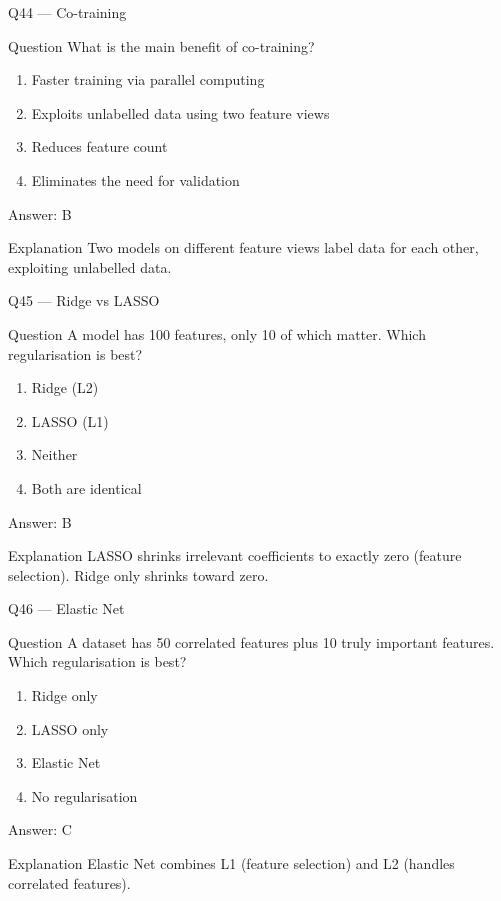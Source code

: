 \documentclass[aspectratio=169,8pt]{beamer}
\begin{document}
	\begin{frame}{Q44 --- Co-training}
		\begin{block}{Question}
			What is the main benefit of co-training?
		\end{block}
		\begin{enumerate}
			\item Faster training via parallel computing
			\item Exploits unlabelled data using two feature views
			\item Reduces feature count
			\item Eliminates the need for validation
		\end{enumerate}
		\begin{exampleblock}{Answer: B}\end{exampleblock}
		\begin{block}{Explanation}
			Two models on different feature views label data for each other, exploiting unlabelled data.
		\end{block}
	\end{frame}
	
	\begin{frame}{Q45 --- Ridge vs LASSO}
		\begin{block}{Question}
			A model has 100 features, only 10 of which matter. Which regularisation is best?
		\end{block}
		\begin{enumerate}
			\item Ridge (L2)
			\item LASSO (L1)
			\item Neither
			\item Both are identical
		\end{enumerate}
		\begin{exampleblock}{Answer: B}\end{exampleblock}
		\begin{block}{Explanation}
			LASSO shrinks irrelevant coefficients to exactly zero (feature selection). Ridge only shrinks toward zero.
		\end{block}
	\end{frame}
	
	\begin{frame}{Q46 --- Elastic Net}
		\begin{block}{Question}
			A dataset has 50 correlated features plus 10 truly important features. Which regularisation is best?
		\end{block}
		\begin{enumerate}
			\item Ridge only
			\item LASSO only
			\item Elastic Net
			\item No regularisation
		\end{enumerate}
		\begin{exampleblock}{Answer: C}\end{exampleblock}
		\begin{block}{Explanation}
			Elastic Net combines L1 (feature selection) and L2 (handles correlated features).
		\end{block}
	\end{frame}
	
\end{document}

